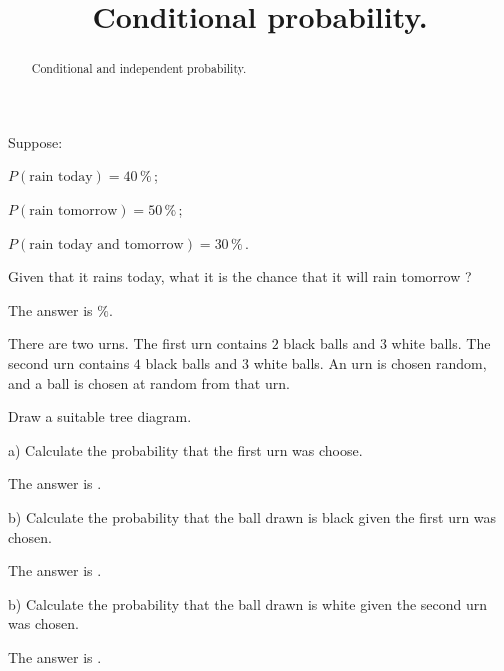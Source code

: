 \documentclass{ximera}
\title{Conditional probability.}
\begin{document}
\begin{abstract}
Conditional and independent probability.
\end{abstract}
\maketitle

\begin{question}
Suppose:

$P(\text{rain today})=40\,\%\,$; 

$P(\text{rain tomorrow})=50\,\%\,$; 

$P(\text{rain today and tomorrow})=30\,\%\,$.

Given that it rains today, what it is the chance that it will rain tomorrow ?
     \begin{solution}
           The answer is  $\%$.
     \end{solution}
\end{question}

There are two urns. The first urn contains $2$ black balls and $3$ white balls. The second urn contains $4$ black balls and $3$ white balls. An urn is chosen random, and a ball is chosen at random from that urn.
     \begin{hint}
          Draw a suitable tree diagram.
     \end{hint}

\begin{question}
a) Calculate the probability that the first urn was choose.
     \begin{solution}
           The answer is .
     \end{solution}
\end{question}

\begin{question}
b) Calculate the probability that the ball drawn is black given the first urn was chosen.
     \begin{solution}
           The answer is .
     \end{solution}
\end{question}

\begin{question}
b) Calculate the probability that the ball drawn is white given the second urn was chosen.
     \begin{solution}
           The answer is .
     \end{solution}
\end{question}
\end{document}
